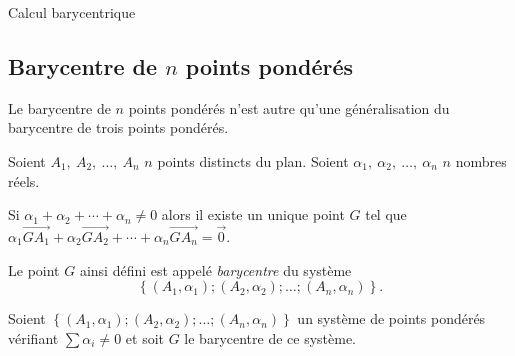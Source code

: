 \begin{chapter}{Calcul barycentrique}
\subsection{Barycentre de $n$ points pond\'er\'es}
%
Le barycentre de $n$ points pond\'er\'es n'est autre qu'une g\'en\'eralisation du barycentre de trois points pond\'er\'es.
      \begin{defi}
            Soient $A_1,\ A_2,\ \ldots ,\ A_n$ $n$ points distincts du plan.
            Soient $\alpha_1,\ \alpha_2,\ \ldots ,\ \alpha_n$ $n$ nombres r\'eels.
            
            Si $\alpha_1 + \alpha_2 + \cdots + \alpha_n \neq 0$ alors il existe un unique point $G$ 
            tel que $\alpha_1 \overrightarrow{GA_1} + \alpha_2 \overrightarrow{GA_2} + \cdots + \alpha_n \overrightarrow{GA_n} = \vec{0}$.
            
	            Le point $G$ ainsi d\'efini est appel\'e \emph{barycentre} du syst\`eme 
	            \[
	              \left\lbrace (A_1,\alpha_1) ; (A_2,\alpha_2) ; \ldots ; (A_n,\alpha_n) \right\rbrace.
	            \]
      \end{defi}
      \begin{prop}
            Soient 
            $\left\lbrace (A_1,\alpha_1) ; (A_2,\alpha_2) ; \ldots ; (A_n,\alpha_n) \right\rbrace$
            un syst\`eme de points pond\'er\'es v\'erifiant $\sum \alpha_i \neq 0$ et soit $G$ le barycentre de ce syst\`eme.
            

\end{prop}
\end{chapter}
